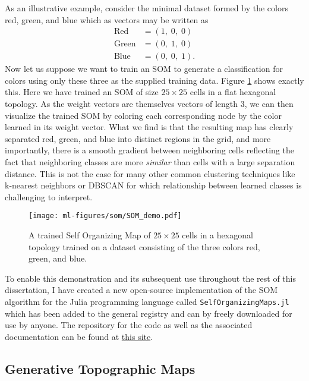 As an illustrative example, consider the minimal dataset formed by the colors red, green, and blue which as vectors may be written as
\begin{align}
  \text{Red} &= \left(1,\; 0,\; 0 \right)\\
  \text{Green} &= \left(0,\; 1,\; 0 \right) \\
  \text{Blue} &= \left(0,\; 0,\; 1 \right).
\end{align}
Now let us suppose we want to train an SOM to generate a classification for colors using only these three as the supplied training data. Figure \ref{fig:som-demo} shows exactly this. Here we have trained an SOM of size $25 \times 25$ cells in a flat hexagonal topology. As the weight vectors are themselves vectors of length $3$, we can then visualize the trained SOM by coloring each corresponding node by the color learned in its weight vector. What we find is that the resulting map has clearly separated red, green, and blue into distinct regions in the grid, and more importantly, there is a smooth gradient between neighboring cells reflecting the fact that neighboring classes are more \textit{similar} than cells with a large separation distance. This is not the case for many other common clustering techniques like k-nearest neighbors or DBSCAN for which relationship between learned classes is challenging to interpret.

\begin{figure}[h!]
  \centering
  \texttt{[image: ml-figures/som/SOM\_demo.pdf]}
  \caption{A trained Self Organizing Map of $25\times 25$ cells in a hexagonal topology trained on a dataset consisting of the three colors red, green, and blue.}
  \label{fig:som-demo}
\end{figure}

To enable this demonstration and its subsequent use throughout the rest of this dissertation, I have created a new open-source implementation of the SOM algorithm for the Julia programming language called \texttt{SelfOrganizingMaps.jl} which has been added to the general registry and can by freely downloaded for use by anyone. The repository for the code as well as the associated documentation can be found at \href{https://github.com/john-waczak/SelfOrganizingMaps.jl}{this site}.

\subsection{Generative Topographic Maps}

